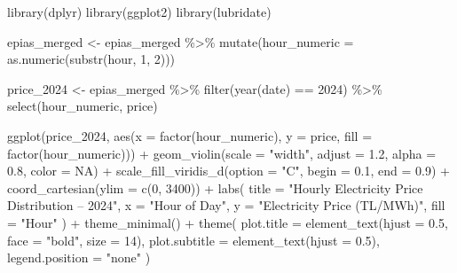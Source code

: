 \documentclass[
  11pt,
  a4paper,
]{article}
\newenvironment{Shaded}{\begin{snugshade}}{\end{snugshade}}
\newcommand{\AttributeTok}[1]{\textcolor[rgb]{0.40,0.45,0.13}{#1}}
\newcommand{\ConstantTok}[1]{\textcolor[rgb]{0.56,0.35,0.01}{#1}}
\newcommand{\DecValTok}[1]{\textcolor[rgb]{0.68,0.00,0.00}{#1}}
\newcommand{\FloatTok}[1]{\textcolor[rgb]{0.68,0.00,0.00}{#1}}
\newcommand{\FunctionTok}[1]{\textcolor[rgb]{0.28,0.35,0.67}{#1}}
\newcommand{\NormalTok}[1]{\textcolor[rgb]{0.00,0.23,0.31}{#1}}
\newcommand{\OtherTok}[1]{\textcolor[rgb]{0.00,0.23,0.31}{#1}}
\newcommand{\SpecialCharTok}[1]{\textcolor[rgb]{0.37,0.37,0.37}{#1}}
\newcommand{\StringTok}[1]{\textcolor[rgb]{0.13,0.47,0.30}{#1}}
\begin{document}
\begin{Shaded}
\begin{Highlighting}[]
\FunctionTok{library}\NormalTok{(dplyr)}
\FunctionTok{library}\NormalTok{(ggplot2)}
\FunctionTok{library}\NormalTok{(lubridate)}

\NormalTok{epias\_merged }\OtherTok{\textless{}{-}}\NormalTok{ epias\_merged }\SpecialCharTok{\%\textgreater{}\%}
  \FunctionTok{mutate}\NormalTok{(}\AttributeTok{hour\_numeric =} \FunctionTok{as.numeric}\NormalTok{(}\FunctionTok{substr}\NormalTok{(hour, }\DecValTok{1}\NormalTok{, }\DecValTok{2}\NormalTok{)))}

\NormalTok{price\_2024 }\OtherTok{\textless{}{-}}\NormalTok{ epias\_merged }\SpecialCharTok{\%\textgreater{}\%}
  \FunctionTok{filter}\NormalTok{(}\FunctionTok{year}\NormalTok{(date) }\SpecialCharTok{==} \DecValTok{2024}\NormalTok{) }\SpecialCharTok{\%\textgreater{}\%}
  \FunctionTok{select}\NormalTok{(hour\_numeric, price)}

\FunctionTok{ggplot}\NormalTok{(price\_2024, }\FunctionTok{aes}\NormalTok{(}\AttributeTok{x =} \FunctionTok{factor}\NormalTok{(hour\_numeric), }\AttributeTok{y =}\NormalTok{ price, }\AttributeTok{fill =} \FunctionTok{factor}\NormalTok{(hour\_numeric))) }\SpecialCharTok{+}
  \FunctionTok{geom\_violin}\NormalTok{(}\AttributeTok{scale =} \StringTok{"width"}\NormalTok{, }\AttributeTok{adjust =} \FloatTok{1.2}\NormalTok{, }\AttributeTok{alpha =} \FloatTok{0.8}\NormalTok{, }\AttributeTok{color =} \ConstantTok{NA}\NormalTok{) }\SpecialCharTok{+}
  \FunctionTok{scale\_fill\_viridis\_d}\NormalTok{(}\AttributeTok{option =} \StringTok{"C"}\NormalTok{, }\AttributeTok{begin =} \FloatTok{0.1}\NormalTok{, }\AttributeTok{end =} \FloatTok{0.9}\NormalTok{) }\SpecialCharTok{+}
  \FunctionTok{coord\_cartesian}\NormalTok{(}\AttributeTok{ylim =} \FunctionTok{c}\NormalTok{(}\DecValTok{0}\NormalTok{, }\DecValTok{3400}\NormalTok{)) }\SpecialCharTok{+}  
  \FunctionTok{labs}\NormalTok{(}
    \AttributeTok{title =} \StringTok{"Hourly Electricity Price Distribution – 2024"}\NormalTok{,}
    \AttributeTok{x =} \StringTok{"Hour of Day"}\NormalTok{,}
    \AttributeTok{y =} \StringTok{"Electricity Price (TL/MWh)"}\NormalTok{,}
    \AttributeTok{fill =} \StringTok{"Hour"}
\NormalTok{  ) }\SpecialCharTok{+}
  \FunctionTok{theme\_minimal}\NormalTok{() }\SpecialCharTok{+}
  \FunctionTok{theme}\NormalTok{(}
    \AttributeTok{plot.title =} \FunctionTok{element\_text}\NormalTok{(}\AttributeTok{hjust =} \FloatTok{0.5}\NormalTok{, }\AttributeTok{face =} \StringTok{"bold"}\NormalTok{, }\AttributeTok{size =} \DecValTok{14}\NormalTok{),}
    \AttributeTok{plot.subtitle =} \FunctionTok{element\_text}\NormalTok{(}\AttributeTok{hjust =} \FloatTok{0.5}\NormalTok{),}
    \AttributeTok{legend.position =} \StringTok{"none"}
\NormalTok{  )}
\end{Highlighting}
\end{Shaded}
\end{document}
